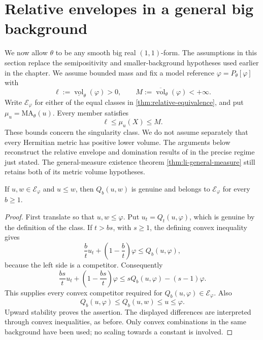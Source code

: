 \section{Relative envelopes in a general big background}
\label{sec:big-relative-foundations}

We now allow $\theta$ to be any smooth big real $(1,1)$-form. The assumptions in this section replace the semipositivity and smaller-background hypotheses used earlier in the chapter. We assume bounded mass and fix a model reference $\varphi=P_\theta[\varphi]$ with
\[
 \ell:=\underline{\operatorname{vol}}_\theta(\varphi)>0,
 \qquad M:=\overline{\operatorname{vol}}_\theta(\varphi)<+\infty.
\]
Write $\mathcal E_\varphi$ for either of the equal classes in \cref{thm:relative-equivalence}, and put $\mu_u=\mathrm{MA}_\theta(u)$. Every member satisfies
\begin{equation}\label{eq:big-relative-mass-interval}
 \ell\leq\mu_u(X)\leq M.
\end{equation}
These bounds concern the singularity class. We do not assume separately that every Hermitian metric has positive lower volume. The arguments below reconstruct the relative envelope and domination results of \cite[Sections 3--4]{XL26} in the precise regime just stated. The general-measure existence theorem \cref{thm:li-general-measure} still retains both of its metric volume hypotheses.

\begin{lemma}\label{lem:big-relative-stretch}
If $u,w\in\mathcal E_\varphi$ and $u\leq w$, then $Q_b(u,w)$ is genuine and belongs to $\mathcal E_\varphi$ for every $b\geq1$.
\end{lemma}
\begin{proof}
First translate so that $u,w\leq\varphi$. Put $u_t=Q_t(u,\varphi)$, which is genuine by the definition of the class. If $t>bs$, with $s\geq1$, the defining convex inequality gives
\[
 \frac bt u_t+\left(1-\frac bt\right)\varphi\leq Q_b(u,\varphi),
\]
because the left side is a competitor. Consequently
\[
 \frac{bs}{t}u_t+\left(1-\frac{bs}{t}\right)\varphi
 \leq sQ_b(u,\varphi)-(s-1)\varphi.
\]
This supplies every convex competitor required for $Q_b(u,\varphi)\in\mathcal E_\varphi$. Also
\[
 Q_b(u,\varphi)\leq Q_b(u,w)\leq u\leq\varphi.
\]
Upward stability proves the assertion. The displayed differences are interpreted through convex inequalities, as before. Only convex combinations in the same background have been used; no scaling towards a constant is involved.
\end{proof}

